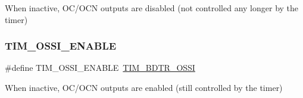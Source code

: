 When inactive, O\+C/\+O\+CN outputs are disabled (not controlled any longer by the timer) \mbox{\label{group___t_i_m___o_s_s_i___off___state___selection__for___idle__mode__state_gae5b5901b177cd054cd5503630892680f}} 
\subsubsection{\texorpdfstring{TIM\_OSSI\_ENABLE}{TIM\_OSSI\_ENABLE}}
{\footnotesize\ttfamily \#define T\+I\+M\+\_\+\+O\+S\+S\+I\+\_\+\+E\+N\+A\+B\+LE~\mbox{\hyperlink{group___peripheral___registers___bits___definition_gab1cf04e70ccf3d4aba5afcf2496a411a}{T\+I\+M\+\_\+\+B\+D\+T\+R\+\_\+\+O\+S\+SI}}}

When inactive, O\+C/\+O\+CN outputs are enabled (still controlled by the timer) 